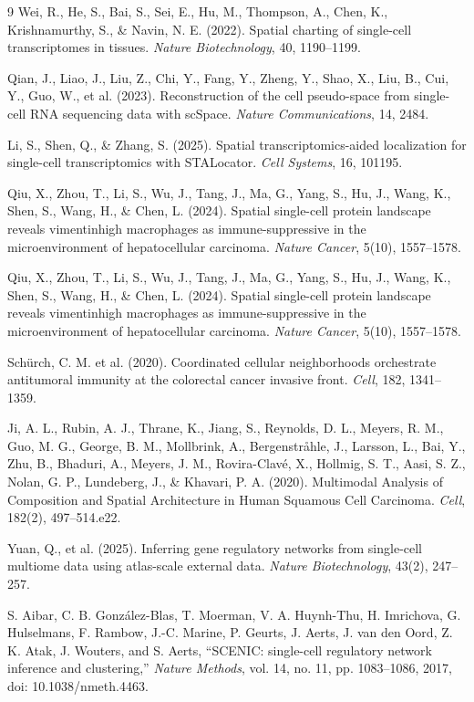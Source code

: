 \documentclass[10pt,a4paper]{article}
\begin{document}
\begin{thebibliography}{9}
Wei, R., He, S., Bai, S., Sei, E., Hu, M., Thompson, A., Chen, K., Krishnamurthy, S., \& Navin, N. E. (2022). Spatial charting of single-cell transcriptomes in tissues. \emph{Nature Biotechnology}, 40, 1190–1199.

Qian, J., Liao, J., Liu, Z., Chi, Y., Fang, Y., Zheng, Y., Shao, X., Liu, B., Cui, Y., Guo, W., et al. (2023). Reconstruction of the cell pseudo-space from single-cell RNA sequencing data with scSpace. \emph{Nature Communications}, 14, 2484.

Li, S., Shen, Q., \& Zhang, S. (2025). Spatial transcriptomics-aided localization for single-cell transcriptomics with STALocator. \emph{Cell Systems}, 16, 101195.

Qiu, X., Zhou, T., Li, S., Wu, J., Tang, J., Ma, G., Yang, S., Hu, J., Wang, K., Shen, S., Wang, H., \& Chen, L. (2024). Spatial single-cell protein landscape reveals vimentinhigh macrophages as immune-suppressive in the microenvironment of hepatocellular carcinoma. \emph{Nature Cancer}, 5(10), 1557–1578.

Qiu, X., Zhou, T., Li, S., Wu, J., Tang, J., Ma, G., Yang, S., Hu, J., Wang, K., Shen, S., Wang, H., \& Chen, L. (2024). Spatial single-cell protein landscape reveals vimentinhigh macrophages as immune-suppressive in the microenvironment of hepatocellular carcinoma. \emph{Nature Cancer}, 5(10), 1557–1578.

Schürch, C. M. et al. (2020). Coordinated cellular neighborhoods orchestrate antitumoral immunity at the colorectal cancer invasive front. \emph{Cell}, 182, 1341–1359.

Ji, A. L., Rubin, A. J., Thrane, K., Jiang, S., Reynolds, D. L., Meyers, R. M., Guo, M. G., George, B. M., Mollbrink, A., Bergenstråhle, J., Larsson, L., Bai, Y., Zhu, B., Bhaduri, A., Meyers, J. M., Rovira-Clavé, X., Hollmig, S. T., Aasi, S. Z., Nolan, G. P., Lundeberg, J., \& Khavari, P. A. (2020). Multimodal Analysis of Composition and Spatial Architecture in Human Squamous Cell Carcinoma. \emph{Cell}, 182(2), 497–514.e22.

Yuan, Q., et al. (2025). Inferring gene regulatory networks from single-cell multiome data using atlas-scale external data. \emph{Nature Biotechnology}, 43(2), 247–257. 

 S. Aibar, C. B. Gonz\'alez-Blas, T. Moerman, V. A. Huynh-Thu, H. Imrichova, G. Hulselmans, F. Rambow, J.-C. Marine, P. Geurts, J. Aerts, J. van den Oord, Z. K. Atak, J. Wouters, and S. Aerts, ``SCENIC: single-cell regulatory network inference and clustering,'' \emph{Nature Methods}, vol. 14, no. 11, pp. 1083--1086, 2017, doi: 10.1038/nmeth.4463.


\end{thebibliography}
\end{document}
